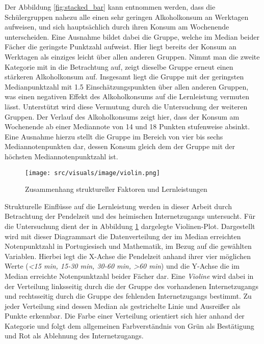 Der Abbildung \ref*{fig:stacked_bar} kann entnommen werden, dass die Schülergruppen nahezu alle einen sehr geringen Alkoholkonsum an Werktagen aufweisen, und sich hauptsächlich durch ihren Konsum am Wochenende unterscheiden.
Eine Ausnahme bildet dabei die Gruppe, welche im Median beider Fächer die geringste Punktzahl aufweist. 
Hier liegt bereits der Konsum an Werktagen als einziges leicht über allen anderen Gruppen.
Nimmt man die zweite Kategorie mit in die Betrachtung auf, zeigt dieselbe Gruppe erneut einen stärkeren Alkoholkonsum auf.
Insgesamt liegt die Gruppe mit der geringsten Medianpunktzahl mit 1.5 Einschätzungspunkten über allen anderen Gruppen, was einen negativen Effekt des Alkoholkonsums auf die Lernleistung vermuten lässt.
Unterstützt wird diese Vermutung durch die Untersuchung der weiteren Gruppen. 
Der Verlauf des Alkoholkonsums zeigt hier, dass der Konsum am Wochenende ab einer Mediannote von 14 und 18 Punkten stufenweise absinkt. 
Eine Ausnahme hierzu stellt die Gruppe im Bereich von vier bis sechs Mediannotenpunkten dar, dessen Konsum gleich dem der Gruppe mit der höchsten Mediannotenpunktzahl ist.

\begin{figure}[htb]
    \centering
    \texttt{[image: src/visuals/image/violin.png]}
    \caption{Zusammenhang struktureller Faktoren und Lernleistungen}
    \label{fig:violin}
\end{figure}

Strukturelle Einflüsse auf die Lernleistung werden in dieser Arbeit durch Betrachtung der Pendelzeit und des heimischen Internetzugangs untersucht.
Für die Untersuchung dient der in Abbildung \ref{fig:violin} dargelegte Violinen-Plot.
Dargestellt wird mit dieser Diagrammart die Datenverteilung der im Median erreichten Notenpunktzahl in Portugiesisch und Mathematik, im Bezug auf die gewählten Variablen.
Hierbei legt die X-Achse die Pendelzeit anhand ihrer vier möglichen Werte (\textit{<15 min, 15-30 min, 30-60 min, >60 min}) und die Y-Achse die im Median erreichte Notenpunktzahl beider Fächer dar.
Eine \textit{Violine} wird dabei in der Verteilung linksseitig durch die der Gruppe des vorhandenen Internetzugangs und rechtsseitig durch die Gruppe des fehlenden Internetzugangs bestimmt.
Zu jeder Verteilung sind dessen Median als gestrichelte Linie und Ausreißer als Punkte erkennbar.
Die Farbe einer Verteilung orientiert sich hier anhand der Kategorie und folgt dem allgemeinen Farbverständnis von Grün als Bestätigung und Rot als Ablehnung des Internetzugangs.

